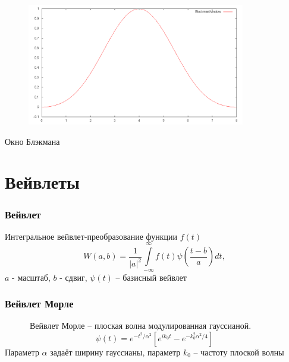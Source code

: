 \documentclass[11pt,slides,aspectratio=43]{beamer}%
\begin{document}
    \begin{frame}
        \begin{figure}[h!]
            \begin{center}
                \includegraphics[width = 0.85\textwidth]{window.png}
            \end{center}
        \end{figure}
        \begin{center}
            Окно Блэкмана
        \end{center}
    \end{frame}

    \section{Вейвлеты}

    \begin{frame}
	\frametitle{Вейвлет}
	   Интегральное вейвлет-преобразование функции $f(t)$
    $$
        W(a, b) = \frac{1}{\left|a\right|^{2}} \int\limits_{-\infty}^{\infty} f(t) \psi(\frac{t - b}{a}) dt,
    $$
    $a$ - масштаб, $b$ - сдвиг, $\psi(t)$ -- базисный вейвлет
    \vskip2pt
	\end{frame}
	
    \begin{frame}
	\frametitle{Вейвлет Морле}
    ~~~~~~Вейвлет Морле -- плоская волна модулированная гауссианой.
    $$
        \psi(t) = e^{-t^{2} / \alpha^{2}}\left[e^{i k_{0} t} - e^{-k_{0}^{2}\alpha^{2}/4}\right]
    $$
    Параметр $\alpha$ задаёт ширину гауссианы, параметр $k_{0}$ -- частоту плоской волны
	\end{frame}
\end{document}

